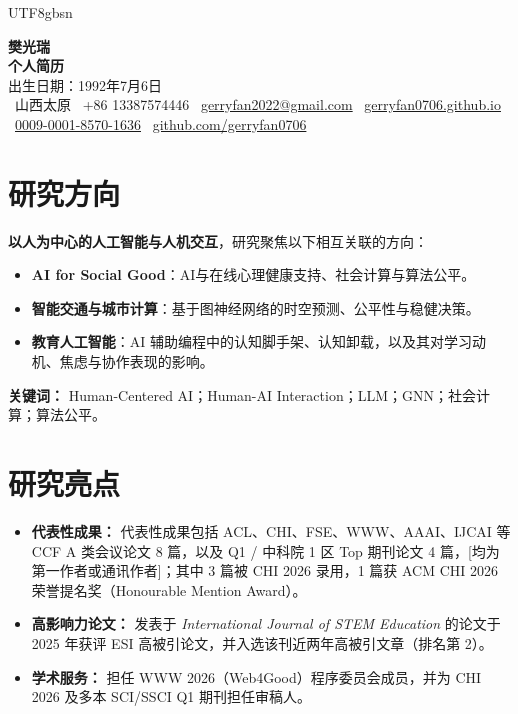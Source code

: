 \documentclass[a4paper,10pt]{article}
\newcommand{\cvlabel}[1]{\textbf{#1}}
\begin{document}
\ifPDFTeX
\begin{CJK*}{UTF8}{gbsn}
\fi

\pagestyle{empty}

\begin{center}
    \textbf{\LARGE 樊光瑞}\\[5pt]
    \textbf{\large 个人简历}\\[3pt]
    出生日期：1992年7月6日\\[2pt]
    \faMapMarker*~山西太原 \quad
    \faPhone~+86 13387574446 \quad
    \faEnvelope~\href{mailto:gerryfan2022@gmail.com}{gerryfan2022@gmail.com} \quad
    \faGlobe~\href{https://gerryfan0706.github.io}{gerryfan0706.github.io}\\[2pt]
    \faOrcid~\href{https://orcid.org/0009-0001-8570-1636}{0009-0001-8570-1636} \quad
    \faGithub~\href{https://github.com/gerryfan0706}{github.com/gerryfan0706}
\end{center}

\section*{研究方向}

\cvlabel{以人为中心的人工智能与人机交互}，研究聚焦以下相互关联的方向：
\begin{itemize}[leftmargin=*]
  \item \cvlabel{AI for Social Good}：AI与在线心理健康支持、社会计算与算法公平。
  \item \cvlabel{智能交通与城市计算}：基于图神经网络的时空预测、公平性与稳健决策。
  \item \cvlabel{教育人工智能}：AI 辅助编程中的认知脚手架、认知卸载，以及其对学习动机、焦虑与协作表现的影响。
\end{itemize}
\noindent\cvlabel{关键词：} Human-Centered AI；Human-AI Interaction；LLM；GNN；社会计算；算法公平。

\section*{研究亮点}
\begin{itemize}[leftmargin=*]
    \item \cvlabel{代表性成果：} 代表性成果包括 ACL、CHI、FSE、WWW、AAAI、IJCAI 等 CCF A 类会议论文 8 篇，以及 Q1 / 中科院 1 区 Top 期刊论文 4 篇，[均为第一作者或通讯作者]；其中 3 篇被 CHI 2026 录用，1 篇获 ACM CHI 2026 荣誉提名奖（Honourable Mention Award）。
    \item \cvlabel{高影响力论文：} 发表于 \textit{International Journal of STEM Education} 的论文于 2025 年获评 ESI 高被引论文，并入选该刊近两年高被引文章（排名第 2）。
    \item \cvlabel{学术服务：} 担任 WWW 2026（Web4Good）程序委员会成员，并为 CHI 2026 及多本 SCI/SSCI Q1 期刊担任审稿人。
\end{itemize}


\end{CJK*}
\end{document}

